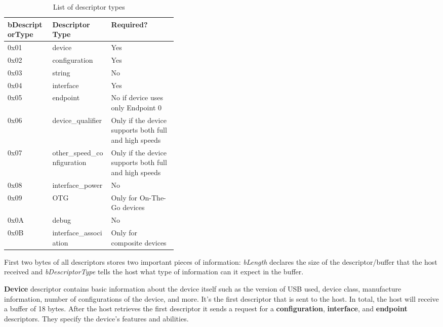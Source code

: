 \begin{table}[ht]
    \centering
    \begin{tabular}{|l|l|p{0.39\linewidth}|} \hline
         \textbf{bDescriptorType} & \textbf{Descriptor Type} & \textbf{Required?} \\ \hline
         0x01 & device                      & Yes \\ \hline
         0x02 & configuration               & Yes \\ \hline
         0x03 & string                      & No  \\ \hline
         0x04 & interface                   & Yes \\ \hline
         0x05 & endpoint                    & No if device uses only Endpoint 0 \\ \hline
         0x06 & device\_qualifier           & Only if the device supports both full and high speeds \\ \hline
         0x07 & other\_speed\_configuration & Only if the device supports both full and high speeds \\ \hline
         0x08 & interface\_power            & No \\ \hline
         0x09 & OTG                         & Only for On-The-Go devices \\ \hline
         0x0A & debug                       & No \\ \hline
         0x0B & interface\_association      & Only for composite devices \\ \hline
         \end{tabular}
    \caption{List of descriptor types}
    \label{tab:descriptor_types}
\end{table}

First two bytes of all descriptors stores two important pieces of information: \emph{bLength} declares the size of the descriptor/buffer that the host received and \emph{bDescriptorType} tells the host what type of information can it expect in the buffer.

\textbf{Device} descriptor contains basic information about the device itself such as the version of USB used, device class, manufacture information, number of configurations of the device, and more. It's the first descriptor that is sent to the host. In total, the host will receive a buffer of 18 bytes. After the host retrieves the first descriptor it sends a request for a \textbf{configuration}, \textbf{interface}, and \textbf{endpoint} descriptors. They specify the device's features and abilities.


